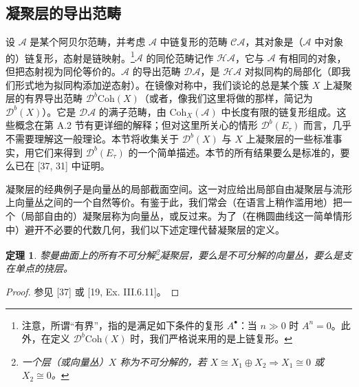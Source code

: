\documentclass[11pt,a4paper]{article}
\theoremstyle{plain}
\newtheorem{theorem}{定理}[section]
\theoremstyle{definition}
\begin{document}
\subsection{凝聚层的导出范畴}

设 $\mathcal{A}$ 是某个阿贝尔范畴，并考虑 $\mathcal{A}$ 中链复形的范畴 $\mathcal{C}\mathcal{A}$，其对象是（$\mathcal{A}$ 中对象的）链复形，态射是链映射。\footnote{注意，所谓“有界”，指的是满足如下条件的复形 $A^\bullet$：当 $n\gg0$ 时 $A^n=0$。此外，在定义 $\mathcal{D}^b\mathrm{Coh}(X)$ 时，我们严格说来用的是上链复形。}$\mathcal{A}$ 的同伦范畴记作 $\mathcal{H}\mathcal{A}$，它与 $\mathcal{A}$ 有相同的对象，但把态射视为同伦等价的。$\mathcal{A}$ 的导出范畴 $\mathcal{D}\mathcal{A}$，是 $\mathcal{H}\mathcal{A}$ 对拟同构的局部化（即我们形式地为拟同构添加逆态射）。在镜像对称中，我们谈论的总是某个簇 $X$ 上凝聚层的有界导出范畴 $\mathcal{D}^b\mathrm{Coh}(X)$（或者，像我们这里将做的那样，简记为 $\mathcal{D}^b(X)$）。它是 $\mathcal{D}\mathcal{A}$ 的满子范畴，由 $\mathrm{Coh}_X(\mathcal{A})$ 中长度有限的链复形组成。这些概念在第 A.2 节有更详细的解释；但对这里所关心的情形 $\mathcal{D}^b(E_\tau)$ 而言，几乎不需要理解这一般理论。本节将收集关于 $\mathcal{D}^b(X)$ 与 $X$ 上凝聚层的一些标准事实，用它们来得到 $\mathcal{D}^b(E_\tau)$ 的一个简单描述。本节的所有结果要么是标准的，要么已在 [37, 31] 中证明。


凝聚层的经典例子是向量丛的局部截面空间。这一对应给出局部自由凝聚层与流形上向量丛之间的一个自然等价。有鉴于此，我们常会（在语言上稍作滥用地）把一个（局部自由的）凝聚层称为向量丛，或反过来。为了（在椭圆曲线这一简单情形中）避开不必要的代数几何，我们以下述定理代替凝聚层的定义。

\begin{theorem}
黎曼曲面上的所有不可分解\footnote{一个层（或向量丛）$X$ 称为不可分解的，若 $X\cong X_1\oplus X_2\Rightarrow X_1\cong0$ 或 $X_2\cong0$。}凝聚层，要么是不可分解的向量丛，要么是支在单点的挠层。
\end{theorem}

\begin{proof}
参见 [37] 或 [19, Ex. III.6.11]。
\end{proof}
\end{document}
